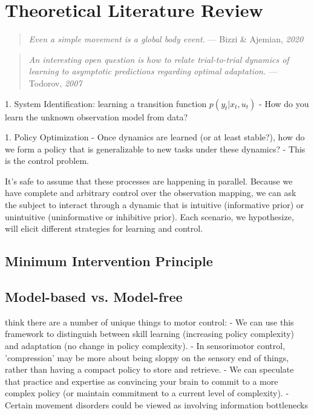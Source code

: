 \documentclass[../main.tex]{subfiles}
\begin{document}
\chapter{Theoretical Literature Review}\label{chap:bg_theory}


\begin{quote}
  \emph{Even a simple movement is a global body event.}
  --- Bizzi \& Ajemian, \emph{2020}
\end{quote}  

\begin{quote}
  \emph{An interesting open question is how to relate trial-to-trial
  dynamics of learning to asymptotic predictions regarding optimal
  adaptation.}
  --- Todorov, \emph{2007}
\end{quote}

1. System Identification: learning a transition function $p(y_t|x_t, u_t)$
- How do you learn the unknown observation model from data?

1. Policy Optimization
- Once dynamics are learned (or at least stable?), how do we form a policy that is generalizable to new tasks under these dynamics?
- This is the control problem.

It's safe to assume that these processes are happening in parallel. Because we have complete and arbitrary control over the observation mapping, we can ask the subject to interact through a  dynamic that is intuitive (informative prior) or unintuitive (uninformative or inhibitive prior). Each scenario, we hypothesize, will elicit different strategies for learning and control.


\section[short]{Minimum Intervention Principle}


\section[short]{Model-based vs. Model-free}

think there are a number of unique things to motor control:
- We can use this framework to distinguish between skill learning (increasing policy complexity) and adaptation (no change in policy complexity).
- In sensorimotor control, 'compression' may be more about being sloppy on the sensory end of things, rather than having a compact policy to store and retrieve.
- We can speculate that practice and expertise as convincing your brain to commit to a more complex policy (or maintain commitment to a current level of complexity).
- Certain movement disorders could be viewed as involving information bottlenecks
\end{document}
